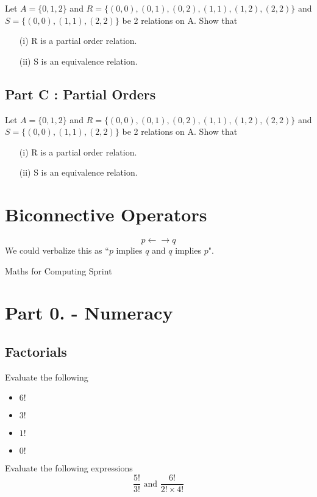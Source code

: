 \documentclass[]{report}
\begin{document}

Let $A=\{0,1,2\}$ and $R=\{ (0,0),(0,1),(0,2),(1,1), (1,2), (2,2)\}$
and $S=\{(0,0),(1,1),(2,2)\}$ be 2 relations on A. Show that

\begin{itemize}
	\item[(i)] R is a partial order relation.
	\item[(ii)] S is an equivalence relation.
\end{itemize}

\subsection*{Part C : Partial Orders}

Let $A=\{0,1,2\}$ and $R=\{ (0,0),(0,1),(0,2),(1,1), (1,2), (2,2)\}$
and $S=\{(0,0),(1,1),(2,2)\}$ be 2 relations on A. Show that

\begin{itemize}
	\item[(i)] R is a partial order relation.
	\item[(ii)] S is an equivalence relation.
\end{itemize}




\section*{Biconnective Operators}

\[ p \leftarrow \rightarrow q\]
We could verbalize this as ``$p$ implies $q$ and $q$ implies $p$".




Maths for Computing Sprint

\section*{Part 0. - Numeracy}
\subsection{Factorials}
Evaluate the following
\begin{itemize}
	\item $6!$
	\item $3!$
	\item $1!$
	\item $0!$
\end{itemize}
Evaluate the following expressions
\[  \frac{5!}{3!}  \mbox{   and   } \frac{6!}{2!\times 4!}  \]
\end{document}
